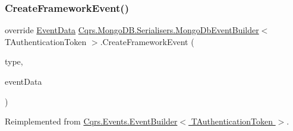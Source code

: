 \subsubsection{\texorpdfstring{Create\+Framework\+Event()}{CreateFrameworkEvent()}}
{\footnotesize\ttfamily override \hyperlink{classCqrs_1_1Events_1_1EventData}{Event\+Data} \hyperlink{classCqrs_1_1MongoDB_1_1Serialisers_1_1MongoDbEventBuilder}{Cqrs.\+Mongo\+D\+B.\+Serialisers.\+Mongo\+Db\+Event\+Builder}$<$ T\+Authentication\+Token $>$.Create\+Framework\+Event (\begin{DoxyParamCaption}\item[{string}]{type,  }\item[{\hyperlink{interfaceCqrs_1_1Events_1_1IEvent}{I\+Event}$<$ T\+Authentication\+Token $>$}]{event\+Data }\end{DoxyParamCaption})\hspace{0.3cm}{\ttfamily [virtual]}}



Reimplemented from \hyperlink{classCqrs_1_1Events_1_1EventBuilder_aa6a794ef27f2795802a4390fd16535f6_aa6a794ef27f2795802a4390fd16535f6}{Cqrs.\+Events.\+Event\+Builder$<$ T\+Authentication\+Token $>$}.

